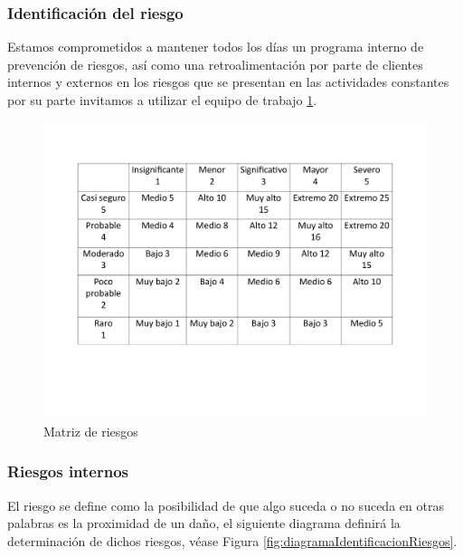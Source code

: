     \subsubsection{Identificación del riesgo}
    
    Estamos comprometidos a mantener todos los días un programa interno de prevención de riesgos, así como una retroalimentación por parte de clientes internos y externos en los riesgos que se presentan en las actividades constantes por su parte invitamos a utilizar el equipo de trabajo \ref{fig:matriz}.
    
    \begin{figure}[H]
        \centering
        \includegraphics[scale=0.28]{21/img/matriz.pdf}
        \caption{Matriz de riesgos}
        \label{fig:matriz}
    \end{figure}
    
    \subsubsection{Riesgos internos}
    
    El riesgo se define como la posibilidad de que algo suceda o no suceda en otras palabras es la proximidad de un daño, el siguiente diagrama definirá la determinación de dichos riesgos, véase Figura \ref{fig:diagramaIdentificacionRiesgos}. 
    
